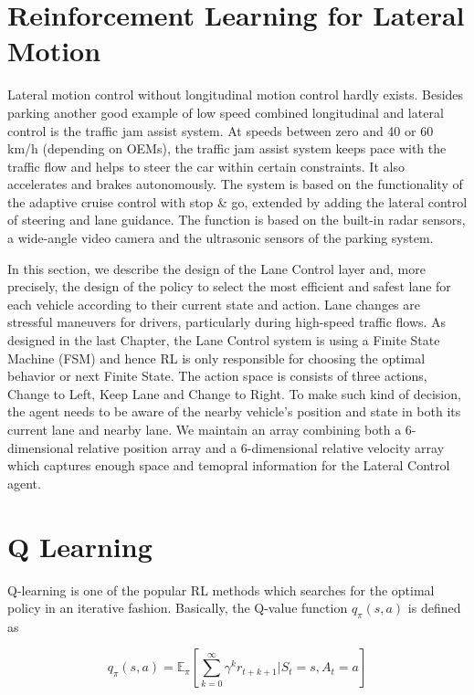 \section{Reinforcement Learning for Lateral Motion}

Lateral motion control without longitudinal motion control hardly exists. Besides parking another good example of low speed combined longitudinal and lateral control is the traffic jam assist system. At speeds between zero and 40 or 60 km/h (depending on OEMs), the traffic jam assist system keeps pace with the traffic flow and helps to steer the car within certain constraints. It also accelerates and brakes autonomously. The system is based on the functionality of the adaptive cruise control with stop \& go, extended by adding the lateral control of steering and lane guidance. The function is based on the built-in radar sensors, a wide-angle video camera and the ultrasonic sensors of the parking system.

In this section, we describe the design of the Lane Control layer and, more precisely, the design of the policy to select the most efficient and safest lane for each vehicle according to their current state and action. Lane changes are stressful maneuvers for drivers, particularly during high-speed traffic flows. As designed in the last Chapter, the Lane Control system is using a Finite State Machine (FSM) and hence RL is only responsible for choosing the optimal behavior or next Finite State. The action space is consists of three actions, Change to Left, Keep Lane and Change to Right. To make such kind of decision, the agent needs to be aware of the nearby vehicle's position and state in both its current lane and nearby lane. We maintain an array combining both a 6-dimensional relative position array and a 6-dimensional relative velocity array which captures enough space and temopral information for the Lateral Control agent.

\section{Q Learning}

Q-learning is one of the popular RL methods which searches for the optimal policy in an iterative fashion. Basically, the Q-value function $q_{\pi} (s, a)$ is defined as

\begin{equation}
q_\pi(s,a) = \mathbb{E}_\pi \left[ \sum _{k=0}^{\infty} \gamma ^k r_{t+k+1} | S_t = s, A_t = a \right]
\end{equation}

